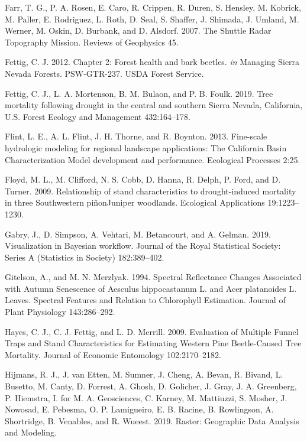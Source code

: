 \documentclass[]{article}
\begin{document}
\hypertarget{ref-farr2007}{}
Farr, T. G., P. A. Rosen, E. Caro, R. Crippen, R. Duren, S. Hensley, M.
Kobrick, M. Paller, E. Rodriguez, L. Roth, D. Seal, S. Shaffer, J.
Shimada, J. Umland, M. Werner, M. Oskin, D. Burbank, and D. Alsdorf.
2007. The Shuttle Radar Topography Mission. Reviews of Geophysics 45.

\hypertarget{ref-fettig2012b}{}
Fettig, C. J. 2012. Chapter 2: Forest health and bark beetles. \emph{in}
Managing Sierra Nevada Forests. PSW-GTR-237. USDA Forest Service.

\hypertarget{ref-fettig2019}{}
Fettig, C. J., L. A. Mortenson, B. M. Bulaon, and P. B. Foulk. 2019.
Tree mortality following drought in the central and southern Sierra
Nevada, California, U.S. Forest Ecology and Management 432:164--178.

\hypertarget{ref-flint2013}{}
Flint, L. E., A. L. Flint, J. H. Thorne, and R. Boynton. 2013.
Fine-scale hydrologic modeling for regional landscape applications: The
California Basin Characterization Model development and performance.
Ecological Processes 2:25.

\hypertarget{ref-floyd2009}{}
Floyd, M. L., M. Clifford, N. S. Cobb, D. Hanna, R. Delph, P. Ford, and
D. Turner. 2009. Relationship of stand characteristics to
drought-induced mortality in three Southwestern piñonJuniper woodlands.
Ecological Applications 19:1223--1230.

\hypertarget{ref-gabry2019}{}
Gabry, J., D. Simpson, A. Vehtari, M. Betancourt, and A. Gelman. 2019.
Visualization in Bayesian workflow. Journal of the Royal Statistical
Society: Series A (Statistics in Society) 182:389--402.

\hypertarget{ref-gitelson1994}{}
Gitelson, A., and M. N. Merzlyak. 1994. Spectral Reflectance Changes
Associated with Autumn Senescence of Aesculus hippocastanum L. and Acer
platanoides L. Leaves. Spectral Features and Relation to Chlorophyll
Estimation. Journal of Plant Physiology 143:286--292.

\hypertarget{ref-hayes2009}{}
Hayes, C. J., C. J. Fettig, and L. D. Merrill. 2009. Evaluation of
Multiple Funnel Traps and Stand Characteristics for Estimating Western
Pine Beetle-Caused Tree Mortality. Journal of Economic Entomology
102:2170--2182.

\hypertarget{ref-hijmans2019}{}
Hijmans, R. J., J. van Etten, M. Sumner, J. Cheng, A. Bevan, R. Bivand,
L. Busetto, M. Canty, D. Forrest, A. Ghosh, D. Golicher, J. Gray, J. A.
Greenberg, P. Hiemstra, I. for M. A. Geosciences, C. Karney, M.
Mattiuzzi, S. Mosher, J. Nowosad, E. Pebesma, O. P. Lamigueiro, E. B.
Racine, B. Rowlingson, A. Shortridge, B. Venables, and R. Wueest. 2019.
Raster: Geographic Data Analysis and Modeling.
\end{document}
